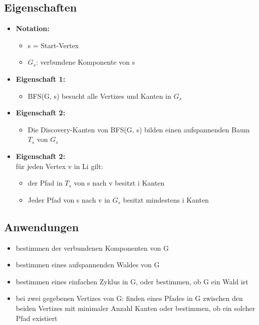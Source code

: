 \subsection{Eigenschaften}
\begin{itemize}
    \item \textbf{Notation:}
    \begin{itemize}
        \item s = Start-Vertex
        \item $G_s$: verbundene Komponente von s
    \end{itemize}
    \item \textbf{Eigenschaft 1:}
    \begin{itemize}
        \item BFS(G, s) besucht alle Vertizes und Kanten in $G_s$
    \end{itemize}
    \item \textbf{Eigenschaft 2:}
    \begin{itemize}
        \item Die Discovery-Kanten von BFS(G, s) bilden einen aufspannenden Baum $T_s$ von $G_s$
    \end{itemize}
    \item \textbf{Eigenschaft 2:}\\
    für jeden Vertex v in Li gilt:
    \begin{itemize}
        \item der Pfad in $T_s$ von s nach v besitzt i Kanten
        \item Jeder Pfad von s nach v in $G_s$ besitzt mindestens i Kanten
    \end{itemize}
\end{itemize}

\subsection{Anwendungen}
\begin{itemize}
    \item bestimmen der verbundenen Komponenten von G
    \item bestimmen eines aufspannenden Waldes von G
    \item bestimmen eines einfachen Zyklus in G, oder bestimmen, ob G ein Wald ist
    \item bei zwei gegebenen Vertizes von G: finden eines Pfades in G zwischen den beiden Vertizes mit minimaler Anzahl Kanten oder bestimmen, ob ein solcher Pfad existiert
\end{itemize}
